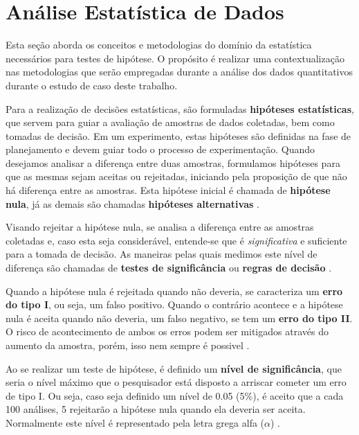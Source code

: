 \section{Análise Estatística de Dados}
\label{sec:ref-analise-dados}

Esta seção aborda os conceitos e metodologias do domínio da estatística necessários para testes de hipótese. O propósito é realizar uma contextualização nas metodologias que serão empregadas durante a análise dos dados quantitativos durante o estudo de caso deste trabalho.

Para a realização de decisões estatísticas, são formuladas \textbf{hipóteses estatísticas}, que servem para guiar a avaliação de amostras de dados coletadas, bem como tomadas de decisão. Em um experimento, estas hipóteses são definidas na fase de planejamento e devem guiar todo o processo de experimentação. Quando desejamos analisar a diferença entre duas amostras, formulamos hipóteses para que as mesmas sejam aceitas ou rejeitadas, iniciando pela proposição de que não há diferença entre as amostras. Esta hipótese inicial é chamada de \textbf{hipótese nula}, já as demais são chamadas \textbf{hipóteses alternativas} \cite{juristo_basics_2001}.

Visando rejeitar a hipótese nula, se analisa a diferença entre as amostras coletadas e, caso esta seja considerável, entende-se que é \textit{significativa} e suficiente para a tomada de decisão. As maneiras pelas quais medimos este nível de diferença são chamadas de \textbf{testes de significância} ou \textbf{regras de decisão} \cite{juristo_basics_2001}.

Quando a hipótese nula é rejeitada quando não deveria, se caracteriza um \textbf{erro do tipo I}, ou seja, um falso positivo. Quando o contrário acontece e a hipótese nula é aceita quando não deveria, um falso negativo, se tem um \textbf{erro do tipo II}. O risco de acontecimento de ambos os erros podem ser mitigados através do aumento da amostra, porém, isso nem sempre é possivel \cite{wohlin_experimentation_2012}.

Ao se realizar um teste de hipótese, é definido um \textbf{nível de significância}, que seria o nível máximo que o pesquisador está disposto a arriscar cometer um erro de tipo I. Ou seja, caso seja definido um nível de 0.05 (5\%), é aceito que a cada 100 análises, 5 rejeitarão a hipótese nula quando ela deveria ser aceita. Normalmente este nível é representado pela letra grega alfa (\( \alpha \)) \cite{juristo_basics_2001}.

